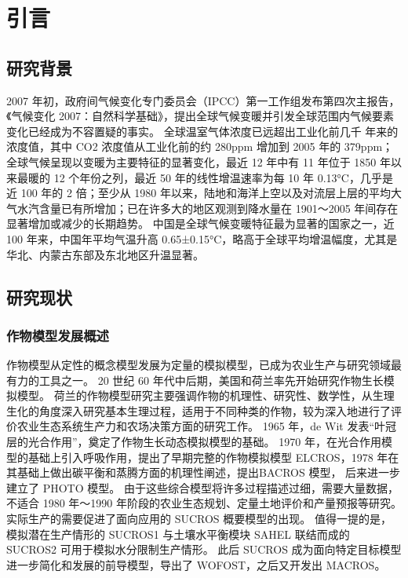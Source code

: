 \documentclass{thuthesis}
\begin{document}
\START
\showoutput

\tableofcontents

\mainmatter

\chapter{引言}

\section{研究背景}

2007 年初，政府间气候变化专门委员会（IPCC）第一工作组发布第四次主报告，《气候变化 2007：自然科学基础》，提出全球气候变暖并引发全球范围内气候要素变化已经成为不容置疑的事实\cite{xinximeng1994xinxi}。
全球温室气体浓度已远超出工业化前几千 年来的浓度值，其中 CO2 浓度值从工业化前的约 280ppm 增加到 2005 年的 379ppm；全球气候呈现以变暖为主要特征的显著变化，最近 12 年中有 11 年位于 1850 年以来最暖的 12 个年份之列，最近 50 年的线性增温速率为每 10 年 0.13°C，几乎是近 100 年的 2 倍；至少从 1980 年以来，陆地和海洋上空以及对流层上层的平均大气水汽含量已有所增加；已在许多大的地区观测到降水量在 1901～2005 年间存在显著增加或减少的长期趋势。
中国是全球气候变暖特征最为显著的国家之一，近 100 年来，中国年平均气温升高 0.65±0.15°C，略高于全球平均增温幅度，尤其是华北、内蒙古东部及东北地区升温显著。


\section{研究现状}

\subsection{作物模型发展概述}

作物模型从定性的概念模型发展为定量的模拟模型，已成为农业生产与研究领域最有力的工具之一。
20 世纪 60 年代中后期，美国和荷兰率先开始研究作物生长模拟模型。
荷兰的作物模型研究主要强调作物的机理性、研究性、数学性，从生理生化的角度深入研究基本生理过程，适用于不同种类的作物，较为深入地进行了评价农业生态系统生产力和农场决策方面的研究工作。
1965 年，de Wit 发表“叶冠层的光合作用”，奠定了作物生长动态模拟模型的基础。
1970 年，在光合作用模型的基础上引入呼吸作用，提出了早期完整的作物模拟模型 ELCROS，1978 年在其基础上做出碳平衡和蒸腾方面的机理性阐述，提出BACROS 模型， 后来进一步建立了 PHOTO 模型。
由于这些综合模型将许多过程描述过细，需要大量数据，不适合 1980 年～1990 年阶段的农业生态规划、定量土地评价和产量预报等研究。
实际生产的需要促进了面向应用的 SUCROS 概要模型的出现。
值得一提的是，模拟潜在生产情形的 SUCROS1 与土壤水平衡模块 SAHEL 联结而成的 SUCROS2 可用于模拟水分限制生产情形。
此后 SUCROS 成为面向特定目标模型 进一步简化和发展的前导模型，导出了 WOFOST，之后又开发出 MACROS。
\end{document}
